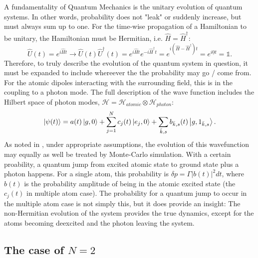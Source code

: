 \documentclass{article}
\begin{document}
A fundamentality of Quantum Mechanics is the unitary evolution of quantum systems. In other words, probability does not "leak" or suddenly increase, but must always sum up to one. For the time-wise propagation of a Hamiltonian to be unitary, the Hamiltonian must be Hermitian, i.e. $\hat{H} = \hat{H}^\dagger$:
\begin{equation}\label{eq:unitarity}
    \hat{U}(t) = e^{i \hat{H} t} \rightarrow \hat{U}(t) \hat{U}^\dagger(t) = e^{i \hat{H} t} e^{-i \hat{H}^\dagger t} = e^{i(\hat{H}-\hat{H}^\dagger) t} = e^{i \underline{0} t} = \mathds{1}.
\end{equation}
Therefore, to truly describe the evolution of the quantum system in question, it must be expanded to include whereever the the probability may go / come from. For the atomic dipoles interacting with the surrounding field, this is in the coupling to a photon mode. The full description of the wave function includes the Hilbert space of photon modes, $\mathscr{H} = \mathscr{H}_{atomic} \otimes \mathscr{H}_{photon}$:
\begin{equation}\label{eq:full_wave_function}
    \ket{\psi(t)} = a(t) \ket{g, 0} + \sum_{j=1}^N c_j(t) \ket{e_j, 0} + \sum_{\bar{k},s} b_{\bar{k},s} (t) \ket{g, 1_{\bar{k},s}}.
\end{equation}
As noted in \cite{MolmerCastin}, under appropriate assumptions, the evolution of this wavefunction may equally as well be treated by Monte-Carlo simulation. With a certain proability, a quantum jump from excited atomic state to ground state plus a photon happens. For a single atom, this probability is $\delta p = \Gamma |b(t)|^2 dt$, where $b(t)$ is the probability amplitude of being in the atomic excited state (the $c_j (t)$ in multiple atom case). The probability for a quantum jump to occur in the multiple atom case is not simply this, but it does provide an insight: The non-Hermitian evolution of the system provides the true dynamics, except for the atoms becoming deexcited and the photon leaving the system. 

\subsection{The case of $N=2$}\label{sec:N2}
\end{document}
